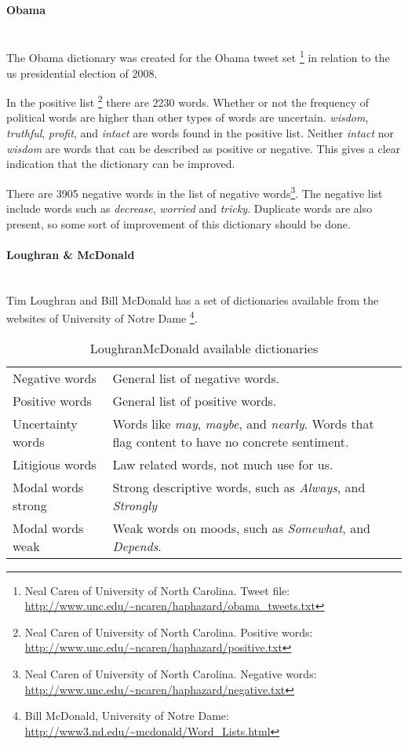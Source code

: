 \paragraph{Obama}
\hspace{0pt}\\
The Obama dictionary was created for the Obama tweet set
\footnote{Neal Caren of University of North Carolina. Tweet file:
\url{http://www.unc.edu/~ncaren/haphazard/obama_tweets.txt}} in relation to the
us presidential election of 2008.

In the positive list \footnote{Neal Caren of University of North Carolina.
Positive words: \url{http://www.unc.edu/~ncaren/haphazard/positive.txt}} there
are 2230 words. Whether or not the frequency of political words are higher than
other types of words are uncertain. \textit{wisdom},
\textit{truthful}, \textit{profit}, and \textit{intact} are words found in
the positive list. Neither \textit{intact} nor \textit{wisdom} are words that
can be described as positive or negative. This gives a clear indication that
the dictionary can be improved.

There are 3905 negative words in the list of negative words\footnote{Neal Caren
of University of North Carolina. Negative words:
\url{http://www.unc.edu/~ncaren/haphazard/negative.txt}}. 
The negative list include words such as \textit{decrease}, \textit{worried} and
\textit{tricky}. Duplicate words are also present, so some sort of improvement
of this dictionary should be done.  
%

\paragraph{Loughran \& McDonald}
\hspace{0pt}\\
Tim Loughran and Bill McDonald has a set of dictionaries available from the
websites of University of Notre Dame \footnote{Bill McDonald, University of
Notre Dame:
\url{http://www3.nd.edu/~mcdonald/Word_Lists.html}}. 

\begin{table}
\centering
\label{tbl:loughran_mcdonald_dictionaries}
\caption{LoughranMcDonald available dictionaries}
\begin{tabular}{ l p{9cm} }
Negative words & General list of negative words. \\
Positive words & General list of positive words. \\
Uncertainty words & Words like \textit{may}, \textit{maybe}, and
\textit{nearly}. Words that flag content to have no concrete sentiment.\\
Litigious words & Law related words, not much use for us. \\
Modal words strong & Strong descriptive words, such as \textit{Always}, and
\textit{Strongly}\\
Modal words weak & Weak words on moods, such as \textit{Somewhat}, and
\textit{Depends}. \\
\end{tabular}
\end{table}

